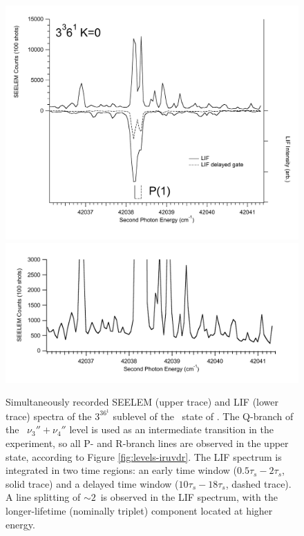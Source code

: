 \documentclass[12pt]{mitthesis}
\begin{document}
\begin{figure}
  \caption{Simultaneously recorded SEELEM (upper trace) and LIF (lower
    trace) spectra of the $3^36^1$  sublevel of the \astate\
    state of .  The Q-branch of the \xstate\ $\nu_3'' +
    \nu_4''$ level is used as an intermediate transition in the
    experiment, so all P- and R-branch lines are observed in the upper
    state, according to Figure \ref{fig:levels-iruvdr}.  The LIF
    spectrum is integrated in two time regions: an early time window
    ($0.5\tau_s-2\tau_s$, solid trace) and a delayed time window
    ($10\tau_s-18\tau_s$, dashed trace).  A line splitting of $\sim
    2$\rcm\ is observed in the LIF spectrum, with the longer-lifetime
    (nominally triplet) component located at higher energy. \TODO{Fix
      energy axis.}}
  \label{fig:3361-p1}
  \centering
  \includegraphics[width=5.8in]{spectrum-3361-p1-split}
  \includegraphics[width=6in]{spectrum-3361-p1-zoom}
\end{figure}
\end{document}
